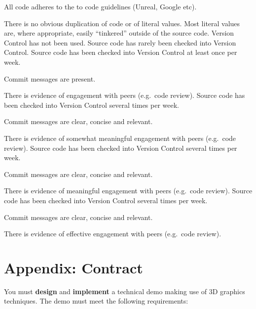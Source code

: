 \documentclass{../../fal_assignment}
\begin{document}
\begin{markingrubric}
\par All code adheres to the to code guidelines (Unreal, Google etc).
\par There is no obvious duplication of code or of literal values. Most literal values are, where appropriate, easily ``tinkered'' outside of the source code.  	
		\grade\fail Version Control has not been used.
		\grade Source code has rarely been checked into Version Control.
		\grade Source code has been checked into Version Control at least once per week.
			\par Commit messages are present.
			\par There is evidence of engagement with peers (e.g.\ code review).
		\grade Source code has been checked into Version Control several times per week.
			\par Commit messages are clear, concise and relevant.
			\par There is evidence of somewhat meaningful engagement with peers (e.g.\ code review).
		\grade Source code has been checked into Version Control several times per week.
			\par Commit messages are clear, concise and relevant.
			\par There is evidence of meaningful engagement with peers (e.g.\ code review).
		\grade Source code has been checked into Version Control several times per week.
			\par Commit messages are clear, concise and relevant.
			\par There is evidence of effective engagement with peers (e.g.\ code review).
\end{markingrubric}

\section*{Appendix: Contract}

You must \textbf{design} and \textbf{implement} a technical demo making use of 3D graphics techniques.
The demo must meet the following requirements:
\end{document}
